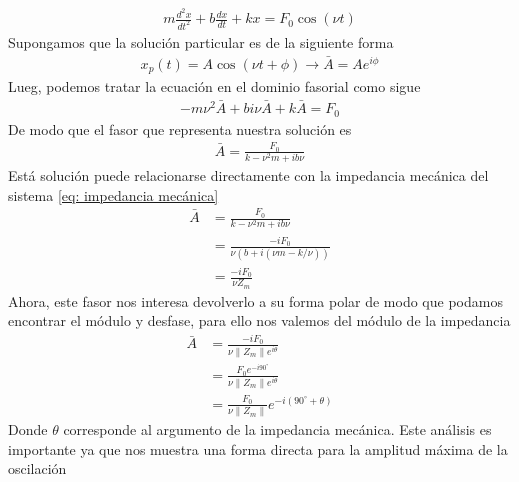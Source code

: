 \documentclass[12pt]{article}
\begin{document}
\begin{align*}
    m\frac{d^{2}x}{dt^{2}} + b\frac{dx}{dt} + k x = F_0 \cos(\nu t)
\end{align*}
Supongamos que la solución particular es de la siguiente forma
\begin{align*}
    x_p(t) = A \cos(\nu t+  \phi) \rightarrow \bar{A} = Ae^{i\phi}
\end{align*}
Lueg, podemos tratar la ecuación en el dominio fasorial como sigue 
\begin{align*}
    -m\nu^{2} \bar{A} + bi\nu \bar{A} + k \bar{A} = F_0 
\end{align*}
De modo que el fasor que representa nuestra solución es
\begin{align*}
    \bar{A} = \frac{F_0}{k - \nu^{2}m + i b\nu}
\end{align*}
Está solución puede relacionarse directamente con la impedancia mecánica del sistema \eqref{eq: impedancia mecánica}
\begin{align*}
    \bar{A} &= \frac{F_0}{k - \nu^{2}m + i b\nu} \\
    &= \frac{-i F_0}{\nu(b + i(\nu m - k/\nu))} \\&= \frac{-i F_0}{\nu Z_m } 
\end{align*}
Ahora, este fasor nos interesa devolverlo a su forma polar de modo que podamos encontrar el módulo y desfase, para ello nos valemos del módulo de la impedancia
\begin{align*}
    \bar{A} &= \frac{-i F_0 }{\nu \|Z_m\| e^{i\theta}}\\
    &= \frac{F_0 e^{-i90^{\circ}}}{\nu \|Z_m\| e^{i\theta}}\\
    &= \frac{F_0}{\nu \|Z_m\|} e^{-i(90^{\circ} + \theta)}
\end{align*}
Donde \(\theta \) corresponde al argumento de la impedancia mecánica. Este análisis es importante ya que nos muestra una forma directa para la amplitud máxima de la oscilación
\end{document}
